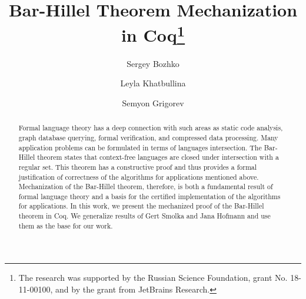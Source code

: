 \documentclass[runningheads]{llncs}
\begin{document}
%
\title{Bar-Hillel Theorem Mechanization in Coq\thanks{The research was supported by the Russian Science Foundation, grant
  No. 18-11-00100, and by the grant from JetBrains Research.}}
%
%
\author{Sergey Bozhko \and
Leyla Khatbullina \and
Semyon Grigorev}
%
%
%
\maketitle              %
%
\begin{abstract}
Formal language theory has a deep connection with such areas as static code analysis, graph database querying, formal verification, and compressed data processing.
Many application problems can be formulated in terms of languages intersection.
The Bar-Hillel theorem states that context-free languages are closed under intersection with a regular set.
This theorem has a constructive proof and thus provides a formal justification of correctness of the algorithms for applications mentioned above.
Mechanization of the Bar-Hillel theorem, therefore, is both a fundamental result of formal language theory and a basis for the certified implementation of the algorithms for applications.
In this work, we present the mechanized proof of the Bar-Hillel theorem in Coq.
We generalize results of Gert Smolka and Jana Hofmann and use them as the base for our work.

\end{abstract}
%
%
%


%




%
%
%
 
 
%
\appendix

\end{document}
